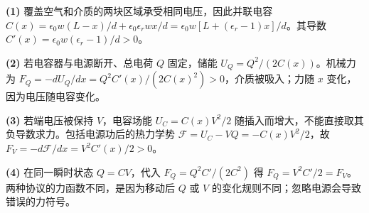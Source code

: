 \par\noindent\textbf{(1)} 覆盖空气和介质的两块区域承受相同电压，因此并联电容 \(C(x)=\epsilon_0w(L-x)/d+\epsilon_0\epsilon_rw x/d=\epsilon_0w[L+(\epsilon_r-1)x]/d\)。其导数 \(C'(x)=\epsilon_0w(\epsilon_r-1)/d>0\)。
\par\noindent\textbf{(2)} 若电容器与电源断开、总电荷 \(Q\) 固定，储能 \(U_Q=Q^2/(2C(x))\)。机械力为 \(F_Q=-dU_Q/dx=Q^2C'(x)/(2C(x)^2)>0\)，介质被吸入；力随 \(x\) 变化，因为电压随电容变化。
\par\noindent\textbf{(3)} 若端电压被保持 \(V\)，电容场能 \(U_C=C(x)V^2/2\) 随插入而增大，不能直接取其负导数求力。包括电源功后的热力学势 \(\mathcal F=U_C-VQ=-C(x)V^2/2\)，故 \(F_V=-d\mathcal F/dx=V^2C'(x)/2>0\)。
\par\noindent\textbf{(4)} 在同一瞬时状态 \(Q=CV\)，代入 \(F_Q=Q^2C'/(2C^2)\) 得 \(F_Q=V^2C'/2=F_V\)。两种协议的力函数不同，是因为移动后 \(Q\) 或 \(V\) 的变化规则不同；忽略电源会导致错误的力符号。
